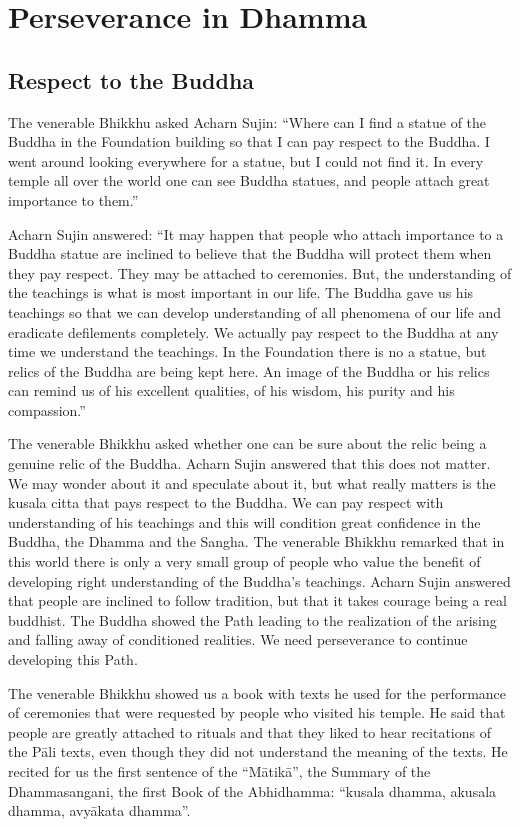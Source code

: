 \part{Perseverance in Dhamma}


\chapter{Respect to the Buddha}

The venerable Bhikkhu asked Acharn Sujin: ``Where can I find a statue of the Buddha in the Foundation building so that I can pay respect to the Buddha. I went around looking everywhere for a statue, but I could not find it. In every temple all over the world one can see Buddha statues, and people attach great importance to them.''

Acharn Sujin answered: ``It may happen that people who attach importance to a Buddha statue are inclined to believe that the Buddha will protect them when they pay respect. They may be attached to ceremonies. But, the understanding of the teachings is what is most important in our life. The Buddha gave us his teachings so that we can develop understanding of all phenomena of our life and eradicate defilements completely. We actually pay respect to the Buddha at any time we understand the teachings. In the Foundation there is no a statue, but relics of the Buddha are being kept here. An image of the Buddha or his relics can remind us of his excellent qualities, of his wisdom, his purity and his compassion.''

The venerable Bhikkhu asked whether one can be sure about the relic being a genuine relic of the Buddha. Acharn Sujin answered that this does not matter. We may wonder about it and speculate about it, but what really matters is the kusala citta that pays respect to the Buddha. We can pay respect with understanding of his teachings and this will condition great confidence in the Buddha, the Dhamma and the Sangha. The venerable Bhikkhu remarked that in this world there is only a very small group of people who value the benefit of developing right understanding of the Buddha’s teachings. Acharn Sujin answered that people are inclined to follow tradition, but that it takes courage being a real buddhist. The Buddha showed the Path leading to the realization of the arising and falling away of conditioned realities. We need perseverance to continue developing this Path.

The venerable Bhikkhu showed us a book with texts he used for the performance of ceremonies that were requested by people who visited his temple. He said that people are greatly attached to rituals and that they liked to hear recitations of the Pāli texts, even though they did not understand the meaning of the texts. He recited for us the first sentence of the ``Mātikā'', the Summary of the Dhammasangani, the first Book of the Abhidhamma: ``kusala dhamma, akusala dhamma, avyākata dhamma''.

